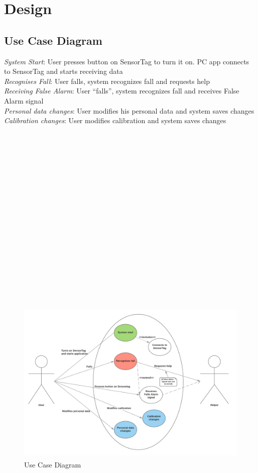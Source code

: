 \documentclass[hidelinks,conference,12pt]{IEEETran}
\begin{document}
\section{Design}
\subsection{Use Case Diagram}

\textit{System Start}: User presses button on SensorTag to turn it on. PC app connects to SensorTag and starts receiving data\\
\textit{Recognises Fall}: User falls, system recognizes fall and requests help\\
\textit{Receiving False Alarm}: User “falls”, system recognizes fall and receives False Alarm signal\\
\textit{Personal data changes}: User modifies his personal data and system saves changes\\
\textit{Calibration changes}:  User modifies calibration and system saves changes\\\\\\\\\\\\\\\\\\\\\\\\\\\\\\\\\\\\\\

\FloatBarrier
\begin{figure}[!h]
	\centering
	\includegraphics[scale=0.23]{images/Use_Case_Diag.png}
	\caption{Use Case Diagram\textsuperscript{\cite{umlspec}}}
	\label{img:Use_Diag}
\end{figure}
\FloatBarrier
\end{document}

